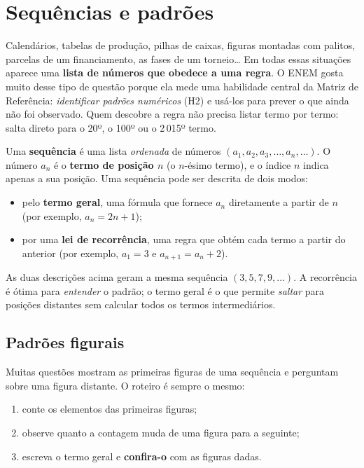 
\section{Sequências e padrões}

Calendários, tabelas de produção, pilhas de caixas, figuras montadas com
palitos, parcelas de um financiamento, as fases de um torneio\dots{} Em todas
essas situações aparece uma \textbf{lista de números que obedece a uma regra}.
O ENEM gosta muito desse tipo de questão porque ela mede uma habilidade central
da Matriz de Referência: \emph{identificar padrões numéricos} (H2) e usá-los
para prever o que ainda não foi observado. Quem descobre a regra não precisa
listar termo por termo: salta direto para o 20º, o 100º ou o 2\,015º termo.

\begin{definicao}[Sequência]
Uma \textbf{sequência} é uma lista \emph{ordenada} de números
$(a_1, a_2, a_3, \dots, a_n, \dots)$. O número $a_n$ é o \textbf{termo de
posição $n$} (o $n$-ésimo termo), e o índice $n$ indica apenas a sua posição.
Uma sequência pode ser descrita de dois modos:
\begin{itemize}[nosep]
  \item pelo \textbf{termo geral}, uma fórmula que fornece $a_n$ diretamente a
        partir de $n$ (por exemplo, $a_n = 2n + 1$);
  \item por uma \textbf{lei de recorrência}, uma regra que obtém cada termo a
        partir do anterior (por exemplo, $a_1 = 3$ e $a_{n+1} = a_n + 2$).
\end{itemize}
\end{definicao}

As duas descrições acima geram a mesma sequência $(3, 5, 7, 9, \dots)$. A
recorrência é ótima para \emph{entender} o padrão; o termo geral é o que permite
\emph{saltar} para posições distantes sem calcular todos os termos
intermediários.

\subsection{Padrões figurais}

Muitas questões mostram as primeiras figuras de uma sequência e perguntam sobre
uma figura distante. O roteiro é sempre o mesmo:
\begin{enumerate}[nosep]
  \item conte os elementos das primeiras figuras;
  \item observe quanto a contagem muda de uma figura para a seguinte;
  \item escreva o termo geral e \textbf{confira-o} com as figuras dadas.
\end{enumerate}

